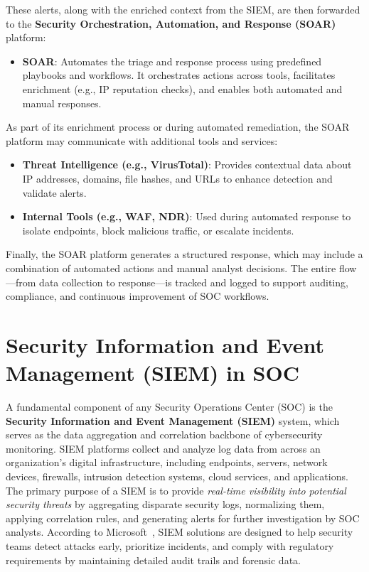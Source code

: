 These alerts, along with the enriched context from the SIEM, are then forwarded to the \textbf{Security Orchestration, Automation, and Response (SOAR)} platform:

\begin{itemize}[itemsep=0pt,parsep=0pt,topsep=0pt,partopsep=0pt]
    \item \textbf{SOAR}: Automates the triage and response process using predefined playbooks and workflows. It orchestrates actions across tools, facilitates enrichment (e.g., IP reputation checks), and enables both automated and manual responses.
\end{itemize}

As part of its enrichment process or during automated remediation, the SOAR platform may communicate with additional tools and services:

\begin{itemize}[itemsep=0pt,parsep=0pt,topsep=0pt,partopsep=0pt]
    \item \textbf{Threat Intelligence (e.g., VirusTotal)}: Provides contextual data about IP addresses, domains, file hashes, and URLs to enhance detection and validate alerts.
    \item \textbf{Internal Tools (e.g., WAF, NDR)}: Used during automated response to isolate endpoints, block malicious traffic, or escalate incidents.
\end{itemize}

Finally, the SOAR platform generates a structured response, which may include a combination of automated actions and manual analyst decisions. The entire flow—from data collection to response—is tracked and logged to support auditing, compliance, and continuous improvement of SOC workflows.

\section{Security Information and Event Management (SIEM) in SOC}

A fundamental component of any Security Operations Center (SOC) is the \textbf{Security Information and Event Management (SIEM)} system, which serves as the data aggregation and correlation backbone of cybersecurity monitoring. SIEM platforms collect and analyze log data from across an organization’s digital infrastructure, including endpoints, servers, network devices, firewalls, intrusion detection systems, cloud services, and applications. The primary purpose of a SIEM is to provide \textit{real-time visibility into potential security threats} by aggregating disparate security logs, normalizing them, applying correlation rules, and generating alerts for further investigation by SOC analysts. According to Microsoft~\cite{microsoftsiem}, SIEM solutions are designed to help security teams detect attacks early, prioritize incidents, and comply with regulatory requirements by maintaining detailed audit trails and forensic data.

